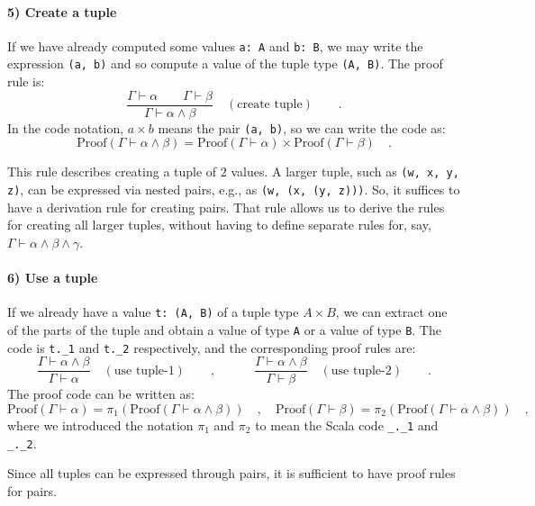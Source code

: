 \paragraph{5) Create a tuple}

If we have already computed some values \lstinline!a: A! and \lstinline!b: B!,
we may write the expression \lstinline!(a, b)! and so compute a value
of the tuple type \lstinline!(A, B)!. The proof rule is:
\[
\frac{\Gamma\vdash\alpha\quad\quad\Gamma\vdash\beta}{\Gamma\vdash\alpha\wedge\beta}\quad(\text{create tuple})\quad\quad.
\]
In the code notation, $a\times b$ means the pair \lstinline!(a, b)!,
so we can write the code as:
\[
\text{Proof}\left(\Gamma\vdash\alpha\wedge\beta\right)=\text{Proof}\left(\Gamma\vdash\alpha\right)\times\text{Proof}\left(\Gamma\vdash\beta\right)\quad.
\]

This rule describes creating a tuple of $2$ values. A larger tuple,
such as \lstinline!(w, x, y, z)!, can be expressed via nested pairs,
e.g., as \lstinline!(w, (x, (y, z)))!. So, it suffices to have a
derivation rule for creating pairs. That rule allows us to derive
the rules for creating all larger tuples, without having to define
separate rules for, say, $\Gamma\vdash\alpha\wedge\beta\wedge\gamma$.

\paragraph{6) Use a tuple}

If we already have a value \lstinline!t: (A, B)! of a tuple type
$A\times B$, we can extract one of the parts of the tuple and obtain
a value of type \lstinline!A! or a value of type \lstinline!B!.
The code is \lstinline!t._1! and \lstinline!t._2! respectively,
and the corresponding  proof rules are:
\[
\frac{\Gamma\vdash\alpha\wedge\beta}{\Gamma\vdash\alpha}\quad(\text{use tuple-}1)\quad\quad,\quad\quad\quad\frac{\Gamma\vdash\alpha\wedge\beta}{\Gamma\vdash\beta}\quad(\text{use tuple-}2)\quad\quad.
\]
The proof code can be written as:
\[
\text{Proof}\left(\Gamma\vdash\alpha\right)=\pi_{1}\left(\text{Proof}\left(\Gamma\vdash\alpha\wedge\beta\right)\right)\quad,\quad\text{Proof}\left(\Gamma\vdash\beta\right)=\pi_{2}\left(\text{Proof}\left(\Gamma\vdash\alpha\wedge\beta\right)\right)\quad,
\]
where we introduced the notation $\pi_{1}$ and $\pi_{2}$ to mean
the Scala code \lstinline!_._1! and \lstinline!_._2!.

Since all tuples can be expressed through pairs, it is sufficient
to have proof rules for pairs.

